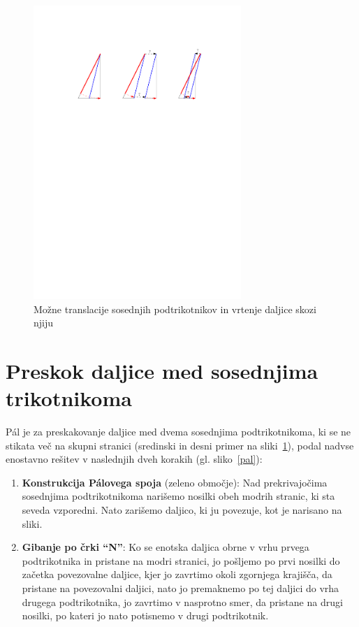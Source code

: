 \documentclass[a4paper, 12pt]{article}
\begin{document}
\begin{figure}[h!]
    \centering
    \includegraphics[width=0.7\textwidth]{ipe_slike/preskok1.pdf}
    \caption{Možne translacije sosednjih podtrikotnikov in vrtenje daljice skozi njiju}
    \label{preskok1}
\end{figure}


\section*{Preskok daljice med sosednjima trikotnikoma}

Pál je za preskakovanje daljice med dvema sosednjima podtrikotnikoma, ki se ne stikata več na skupni stranici (sredinski in desni primer na sliki~\ref{preskok1}), podal nadvse enostavno rešitev v naslednjih dveh korakih (gl. sliko~\ref{pal}):

\begin{enumerate}
    \item \textbf{Konstrukcija Pálovega spoja} (zeleno območje): Nad prekrivajočima sosednjima podtrikotnikoma narišemo nosilki obeh modrih stranic, ki sta seveda vzporedni. Nato zarišemo daljico, ki ju povezuje, kot je narisano na sliki.
    \item \textbf{Gibanje po črki ``N''}: Ko se enotska daljica obrne v vrhu prvega podtrikotnika in pristane na modri stranici, jo pošljemo po prvi nosilki do začetka povezovalne daljice, kjer jo zavrtimo okoli zgornjega krajišča, da pristane na povezovalni daljici, nato jo premaknemo po tej daljici do vrha drugega podtrikotnika, jo zavrtimo v nasprotno smer, da pristane na drugi nosilki, po kateri jo nato potisnemo v drugi podtrikotnik.
\end{enumerate}
\end{document}
